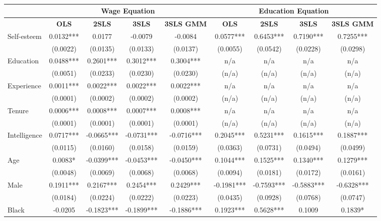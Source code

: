 \documentclass[12pt]{report}
\newcommand{\prbf}[1]{\textbf{#1}}
\begin{document}
\begin{sidewaystable}
\small
\caption{\label{tab:wage87}}
\vspace{2pt}
\centering\begin{tabular}{lc|c|c|c|c|c|c|c}
\hline
\hline
& \multicolumn{4}{|c|}{Wage Equation} & \multicolumn{4}{|c}{Education Equation}\\
\hline
& \prbf{OLS} & \prbf{2SLS} & \prbf{3SLS} & \prbf{3SLS GMM} & \prbf{OLS} & \prbf{2SLS} & \prbf{3SLS} & \prbf{3SLS GMM}\\
\hline
Self-esteem & 0.0132*** & 0.0177 & -0.0079 & -0.0084 & 0.0577*** & 0.6453*** & 0.7190*** & 0.7255***\\
& (0.0022) & (0.0135) & (0.0133) & (0.0137) & (0.0055) & (0.0542) & (0.0228) & (0.0298)\\
Education & 0.0488*** & 0.2601*** & 0.3012*** & 0.3004*** & n/a & n/a & n/a & n/a\\
& (0.0051) & (0.0233) & (0.0230) & (0.0230) & (n/a) & (n/a) & (n/a) & (n/a)\\
Experience & 0.0011*** & 0.0022*** & 0.0022*** & 0.0022*** & n/a & n/a & n/a & n/a\\
& (0.0001) & (0.0002) & (0.0002) & (0.0002) & (n/a) & (n/a) & (n/a) & (n/a)\\
Tenure & 0.0006*** & 0.0008*** & 0.0007*** & 0.0008*** & n/a & n/a & n/a & n/a\\
& (0.0001) & (0.0001) & (0.0001) & (0.0001) & (n/a) & (n/a) & (n/a) & (n/a)\\
Intelligence & 0.0717*** & -0.0665*** & -0.0731*** & -0.0716*** & 0.2045*** & 0.5231*** & 0.1615*** & 0.1887***\\
& (0.0115) & (0.0160) & (0.0158) & (0.0159) & (0.0363) & (0.0731) & (0.0494) & (0.0499)\\
Age & 0.0083* & -0.0399*** & -0.0453*** & -0.0450*** & 0.1044*** & 0.1525*** & 0.1340*** & 0.1279***\\
& (0.0048) & (0.0069) & (0.0068) & (0.0068) & (0.0094) & (0.0181) & (0.0172) & (0.0161)\\
Male & 0.1911*** & 0.2167*** & 0.2454*** & 0.2429*** & -0.1981*** & -0.7593*** & -0.5883*** & -0.6328***\\
& (0.0184) & (0.0224) & (0.0222) & (0.0223) & (0.0435) & (0.0928) & (0.0768) & (0.0747)\\
Black & -0.0205 & -0.1823*** & -0.1899*** & -0.1886*** & 0.1923*** & 0.5628*** & 0.1009 & 0.1839*\\

\end{tabular}
\end{sidewaystable}
\end{document}
